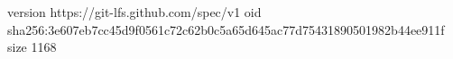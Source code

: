 version https://git-lfs.github.com/spec/v1
oid sha256:3e607eb7cc45d9f0561c72c62b0c5a65d645ac77d75431890501982b44ee911f
size 1168
